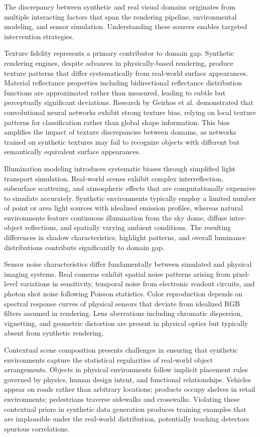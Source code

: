 The discrepancy between synthetic and real visual domains originates from multiple interacting factors that span the rendering pipeline, environmental modeling, and sensor simulation. Understanding these sources enables targeted intervention strategies.

Texture fidelity represents a primary contributor to domain gap. Synthetic rendering engines, despite advances in physically-based rendering, produce texture patterns that differ systematically from real-world surface appearances. Material reflectance properties including bidirectional reflectance distribution functions are approximated rather than measured, leading to subtle but perceptually significant deviations. Research by Geirhos et al. demonstrated that convolutional neural networks exhibit strong texture bias, relying on local texture patterns for classification rather than global shape information. This bias amplifies the impact of texture discrepancies between domains, as networks trained on synthetic textures may fail to recognize objects with different but semantically equivalent surface appearances.

Illumination modeling introduces systematic biases through simplified light transport simulation. Real-world scenes exhibit complex interreflection, subsurface scattering, and atmospheric effects that are computationally expensive to simulate accurately. Synthetic environments typically employ a limited number of point or area light sources with idealized emission profiles, whereas natural environments feature continuous illumination from the sky dome, diffuse inter-object reflections, and spatially varying ambient conditions. The resulting differences in shadow characteristics, highlight patterns, and overall luminance distributions contribute significantly to domain gap.

Sensor noise characteristics differ fundamentally between simulated and physical imaging systems. Real cameras exhibit spatial noise patterns arising from pixel-level variations in sensitivity, temporal noise from electronic readout circuits, and photon shot noise following Poisson statistics. Color reproduction depends on spectral response curves of physical sensors that deviate from idealized RGB filters assumed in rendering. Lens aberrations including chromatic dispersion, vignetting, and geometric distortion are present in physical optics but typically absent from synthetic rendering.

Contextual scene composition presents challenges in ensuring that synthetic environments capture the statistical regularities of real-world object arrangements. Objects in physical environments follow implicit placement rules governed by physics, human design intent, and functional relationships. Vehicles appear on roads rather than arbitrary locations; products occupy shelves in retail environments; pedestrians traverse sidewalks and crosswalks. Violating these contextual priors in synthetic data generation produces training examples that are implausible under the real-world distribution, potentially teaching detectors spurious correlations.

